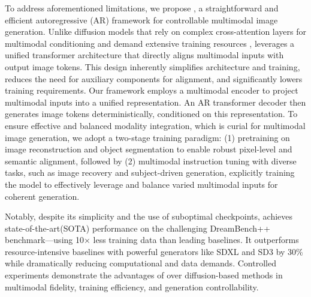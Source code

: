 To address aforementioned limitations, we propose \textbf{\model}, a straightforward and efficient autoregressive (AR) framework for controllable multimodal image generation. Unlike diffusion models that rely on complex cross-attention layers for multimodal conditioning and demand extensive training resources \citep{2024SeedX,emu2,Kosmos-G,li2023blipdiffusionpretrainedsubjectrepresentation},  \model leverages a unified transformer architecture that directly aligns multimodal inputs with output image tokens. This design inherently simplifies architecture and training, reduces the need for auxiliary components for alignment, and significantly lowers training requirements.
Our framework employs a multimodal encoder to project multimodal inputs into a unified representation. An AR transformer decoder then generates image tokens deterministically, conditioned on this representation. To ensure effective and balanced modality integration, which is curial for multimodal image generation\citep{han2024emmatexttoimagediffusionmodel}, we adopt a two-stage training paradigm: (1) pretraining on image reconstruction and object segmentation to enable robust pixel-level and semantic alignment, followed by (2) multimodal instruction tuning with diverse tasks, such as image recovery and subject-driven generation, explicitly training the model to effectively leverage and balance varied multimodal inputs for coherent generation.

Notably, despite its simplicity and the use of suboptimal checkpoints, \model achieves state-of-the-art(SOTA) performance on the challenging DreamBench++ benchmark—using 10× less training data than leading baselines.
It outperforms resource-intensive baselines with powerful generators like SDXL \citep{SDXL} and SD3 \citep{2024SD3} by 30\% while dramatically reducing computational and data demands. 
Controlled experiments demonstrate the advantages of \model over diffusion-based methods in multimodal fidelity, training efficiency, and generation controllability.


 

